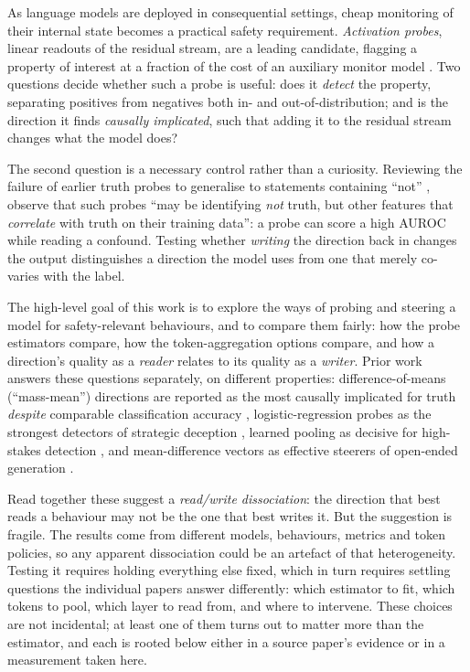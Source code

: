 \documentclass[conference]{IEEEtran}
\begin{document}
As language models are deployed in consequential settings, cheap monitoring of
their internal state becomes a practical safety requirement. \emph{Activation
probes}, linear readouts of the residual stream, are a leading candidate,
flagging a property of interest at a fraction of the cost of an auxiliary monitor
model \citep{alain2018,mckenzie2025}. Two questions decide whether such a probe is
useful: does it \emph{detect} the property, separating positives from negatives
both in- and out-of-distribution; and is the direction it finds
\emph{causally implicated}, such that adding it to the residual stream changes
what the model does?

The second question is a necessary control rather than a curiosity.
Reviewing the failure of earlier truth probes to generalise to statements
containing ``not'' \citep{levinstein2024}, \citet{marks2024} observe that such
probes ``may be identifying \emph{not} truth, but other features that
\emph{correlate} with truth on their training data'': a probe can score a high
AUROC while reading a confound. Testing whether \emph{writing} the direction
back in changes the output distinguishes a direction the model uses from one
that merely co-varies with the label.

The high-level goal of this work is to explore the ways of probing and steering
a model for safety-relevant behaviours, and to compare them fairly: how the
probe estimators compare, how the token-aggregation options compare, and how a
direction's quality as a \emph{reader} relates to its quality as a \emph{writer}.
Prior work answers these questions separately, on different properties:
difference-of-means (``mass-mean'') directions are reported as the most causally
implicated for truth \emph{despite} comparable classification accuracy
\citep{marks2024}, logistic-regression probes as the strongest detectors of
strategic deception \citep{goldowsky2025}, learned pooling as decisive for
high-stakes detection \citep{mckenzie2025}, and mean-difference vectors as
effective steerers of open-ended generation \citep{rimsky2024}.

Read together these suggest a \emph{read/write dissociation}: the direction that
best reads a behaviour may not be the one that best writes it. But the suggestion
is fragile. The results come from different models, behaviours, metrics and token
policies, so any apparent dissociation could be an artefact of that heterogeneity.
Testing it requires holding everything else fixed, which in turn requires settling
questions the individual papers answer differently: which estimator to fit, which
tokens to pool, which layer to read from, and where to intervene. These choices
are not incidental; at least one of them turns out to matter more than the
estimator, and each is rooted below either in a source paper's evidence or in a
measurement taken here.
\end{document}
